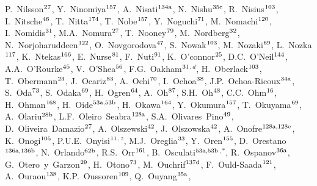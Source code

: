 \begin{flushleft}
P.~Nilsson$^\textrm{\scriptsize 27}$,
Y.~Ninomiya$^\textrm{\scriptsize 157}$,
A.~Nisati$^\textrm{\scriptsize 134a}$,
N.~Nishu$^\textrm{\scriptsize 35c}$,
R.~Nisius$^\textrm{\scriptsize 103}$,
I.~Nitsche$^\textrm{\scriptsize 46}$,
T.~Nitta$^\textrm{\scriptsize 174}$,
T.~Nobe$^\textrm{\scriptsize 157}$,
Y.~Noguchi$^\textrm{\scriptsize 71}$,
M.~Nomachi$^\textrm{\scriptsize 120}$,
I.~Nomidis$^\textrm{\scriptsize 31}$,
M.A.~Nomura$^\textrm{\scriptsize 27}$,
T.~Nooney$^\textrm{\scriptsize 79}$,
M.~Nordberg$^\textrm{\scriptsize 32}$,
N.~Norjoharuddeen$^\textrm{\scriptsize 122}$,
O.~Novgorodova$^\textrm{\scriptsize 47}$,
S.~Nowak$^\textrm{\scriptsize 103}$,
M.~Nozaki$^\textrm{\scriptsize 69}$,
L.~Nozka$^\textrm{\scriptsize 117}$,
K.~Ntekas$^\textrm{\scriptsize 166}$,
E.~Nurse$^\textrm{\scriptsize 81}$,
F.~Nuti$^\textrm{\scriptsize 91}$,
K.~O'connor$^\textrm{\scriptsize 25}$,
D.C.~O'Neil$^\textrm{\scriptsize 144}$,
A.A.~O'Rourke$^\textrm{\scriptsize 45}$,
V.~O'Shea$^\textrm{\scriptsize 56}$,
F.G.~Oakham$^\textrm{\scriptsize 31}$$^{,d}$,
H.~Oberlack$^\textrm{\scriptsize 103}$,
T.~Obermann$^\textrm{\scriptsize 23}$,
J.~Ocariz$^\textrm{\scriptsize 83}$,
A.~Ochi$^\textrm{\scriptsize 70}$,
I.~Ochoa$^\textrm{\scriptsize 38}$,
J.P.~Ochoa-Ricoux$^\textrm{\scriptsize 34a}$,
S.~Oda$^\textrm{\scriptsize 73}$,
S.~Odaka$^\textrm{\scriptsize 69}$,
H.~Ogren$^\textrm{\scriptsize 64}$,
A.~Oh$^\textrm{\scriptsize 87}$,
S.H.~Oh$^\textrm{\scriptsize 48}$,
C.C.~Ohm$^\textrm{\scriptsize 16}$,
H.~Ohman$^\textrm{\scriptsize 168}$,
H.~Oide$^\textrm{\scriptsize 53a,53b}$,
H.~Okawa$^\textrm{\scriptsize 164}$,
Y.~Okumura$^\textrm{\scriptsize 157}$,
T.~Okuyama$^\textrm{\scriptsize 69}$,
A.~Olariu$^\textrm{\scriptsize 28b}$,
L.F.~Oleiro~Seabra$^\textrm{\scriptsize 128a}$,
S.A.~Olivares~Pino$^\textrm{\scriptsize 49}$,
D.~Oliveira~Damazio$^\textrm{\scriptsize 27}$,
A.~Olszewski$^\textrm{\scriptsize 42}$,
J.~Olszowska$^\textrm{\scriptsize 42}$,
A.~Onofre$^\textrm{\scriptsize 128a,128e}$,
K.~Onogi$^\textrm{\scriptsize 105}$,
P.U.E.~Onyisi$^\textrm{\scriptsize 11}$$^{,z}$,
M.J.~Oreglia$^\textrm{\scriptsize 33}$,
Y.~Oren$^\textrm{\scriptsize 155}$,
D.~Orestano$^\textrm{\scriptsize 136a,136b}$,
N.~Orlando$^\textrm{\scriptsize 62b}$,
R.S.~Orr$^\textrm{\scriptsize 161}$,
B.~Osculati$^\textrm{\scriptsize 53a,53b}$$^{,*}$,
R.~Ospanov$^\textrm{\scriptsize 36a}$,
G.~Otero~y~Garzon$^\textrm{\scriptsize 29}$,
H.~Otono$^\textrm{\scriptsize 73}$,
M.~Ouchrif$^\textrm{\scriptsize 137d}$,
F.~Ould-Saada$^\textrm{\scriptsize 121}$,
A.~Ouraou$^\textrm{\scriptsize 138}$,
K.P.~Oussoren$^\textrm{\scriptsize 109}$,
Q.~Ouyang$^\textrm{\scriptsize 35a}$,
$$
\end{flushleft}
